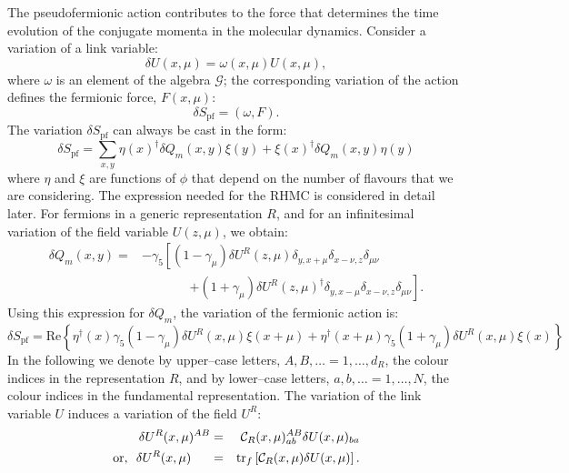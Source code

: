 \documentclass{article}[12pt]
\begin{document}
The pseudofermionic action contributes to the force that determines
the time evolution of the conjugate momenta in the molecular
dynamics. Consider a variation of a link variable:
%
\begin{equation}
\delta U(x,\mu) = \omega(x,\mu) U(x,\mu),
\end{equation}
where $\omega$ is an element of the algebra $\mathcal G$; the
corresponding variation of the action defines the fermionic force,
$F(x,\mu)$:
%
\begin{equation}
\delta S_\mathrm{pf} = \left(\omega,F\right).
\end{equation}
%
The variation $\delta S_\mathrm{pf}$ can always be cast in the form:
%
\begin{equation}
\delta S_\mathrm{pf} = \sum_{x,y} \eta(x)^\dagger \delta Q_m(x,y)
\xi(y) + \xi(x)^\dagger \delta Q_m(x,y) \eta(y)
\end{equation}
%
where $\eta$ and $\xi$ are functions of $\phi$ that depend on the
number of flavours that we are considering. The expression needed for
the RHMC is considered in detail later. For fermions in a generic
representation $R$, and for an infinitesimal variation of the field
variable $U(z,\mu)$, we obtain:
%
\begin{align}
\delta Q_m(x,y) = &-\gamma_5 \left[(1-\gamma_\mu) \delta U^R(z,\mu)
\delta_{y,x+\mu} \delta_{x-\nu,z} \delta_{\mu\nu} \right. \nonumber \\ 
&~~~~~~~~~~~~~~~~~\left. + (1+\gamma_\mu) \delta U^R(z,\mu)^\dagger 
\delta_{y,x-\mu} \delta_{x-\nu,z} \delta_{\mu\nu} \right] \nonumber.
\end{align}
%
Using this expression for $\delta Q_m$, the variation of the fermionic
action is:
%
\begin{equation}
\delta S_\mathrm{pf} = \mathrm{Re} \left\{ \eta^\dagger(x) \gamma_5
\left(1-\gamma_\mu\right) \delta U^R(x,\mu) \xi(x+\mu) +
\eta^\dagger(x+\mu) \gamma_5
\left(1+\gamma_\mu\right) \delta U^R(x,\mu) \xi(x) \right\}
\end{equation}
%
In the following we denote by upper--case letters,
$A,B,\ldots=1,\ldots,d_R$, the colour indices in the representation
$R$, and by lower--case letters, $a,b,\ldots=1,\ldots,N$, the colour
indices in the fundamental representation.  The variation of the link
variable $U$ induces a variation of the field $U^R$:
%
\begin{eqnarray}
\delta U^R(x,\mu)^{AB} &=& {\mathcal C}_R(x,\mu)^{AB}_{ab} 
\delta U(x,\mu)_{ba}\\
\mathrm{or, }~~ \delta U^R(x,\mu) \hspace{15truept}&=& \mathrm{tr }_f 
\left[{\mathcal C}_R(x,\mu) \delta U(x,\mu) \right]\label{eq:dUR}.
\end{eqnarray}
\end{document}
